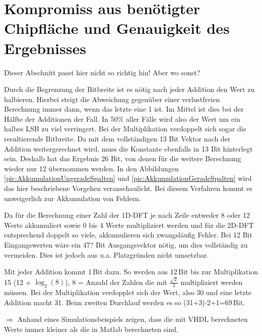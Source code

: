 \section{Kompromiss aus benötigter Chipfläche und Genauigkeit des Ergebnisses}
Dieser Abschnitt passt hier nicht so richtig hin! Aber wo sonst?

Durch die Begrenzung der Bitbreite ist es nötig nach jeder Addition den Wert zu halbieren. Hierbei steigt die Abweichung gegenüber einer verlustfreien Berechnung immer dann, 
wenn das letzte eine 1 ist. Im Mittel ist dies bei der Hälfte der Additionen der Fall. In 50$\%$ aller Fälle wird also der Wert um ein halbes LSB zu viel verringert.
Bei der Multiplikation verdoppelt sich sogar die resultierende Bitbreite. Da mit dem vollständigen 13 Bit Vektor nach der Addition weitergerechnet wird, muss die Konstante
ebenfalls in 13 Bit hinterlegt sein. Deshalb hat das Ergebnis 26 Bit, von denen für die weitere Berechnung wieder nur 12 übernommen werden. In den Abbildungen 
\ref{pic:AkkumulationUngeradeSpalten} und \ref{pic:AkkumulationGeradeSpalten} wird das hier beschriebene Vorgehen veranschaulicht. Bei diesem Verfahren
kommt es unweigerlich zur Akkumulation von Fehlern.
 
Da für die Berechnung einer Zahl der 1D-DFT je nach Zeile entweder 8 oder 12 Werte akkumuliert sowie 0 bis 4 Werte multipliziert werden und für die 2D-DFT entsprechend doppelt 
so viele, akkumulieren sich zwangsläufig Fehler. Bei 12 Bit Eingangswerten wäre ein 47? Bit Ausgangsvektor nötig, um dies vollständig zu vermeiden. Dies ist jedoch aus u.a.
Platzgründen nicht umsetzbar.

Mit jeder Addition kommt 1\,Bit dazu. So werden aus 12\,Bit bis zur Multiplikation 15 (12 + $\log_2(8)$), 8 = Anzahl der Zahlen die mit $\tfrac{\sqrt{2}}{2}$ multipliziert
werden müssen. Bei der Multiplikation verdopplet sich der Wert, also 30 und eine letzte Addition macht 31.
Beim zweiten Durchlauf werden es so (31+3)$\cdot$2+1=69\,Bit.

$\Rightarrow$ Anhand eines Simulationsbeispiels zeigen, dass die mit VHDL berechneten Werte immer kleiner als die in Matlab berechneten sind.


 
 

%

